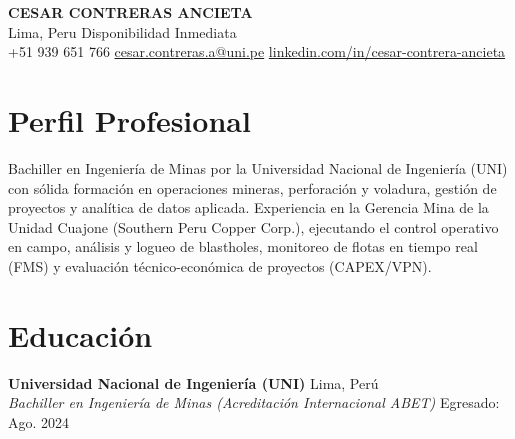 \documentclass[10pt, letterpaper]{article}
\begin{document}
\pagestyle{empty}

\begin{center}
    {\Huge \textbf{CESAR CONTRERAS ANCIETA}} \\
    \vspace{3pt}
    Lima, Peru \quad \textbar \quad Disponibilidad Inmediata \\
    +51 939 651 766 \quad \textbar \quad \href{mailto:cesar.contreras.a@uni.pe}{cesar.contreras.a@uni.pe} \quad \textbar \quad \href{https://linkedin.com/in/cesar-contrera-ancieta}{linkedin.com/in/cesar-contrera-ancieta}
\end{center}

\vspace{2pt}

\section{Perfil Profesional}
Bachiller en Ingeniería de Minas por la Universidad Nacional de Ingeniería (UNI) con sólida formación en operaciones mineras, perforación y voladura, gestión de proyectos y analítica de datos aplicada. Experiencia en la Gerencia Mina de la Unidad Cuajone (Southern Peru Copper Corp.), ejecutando el control operativo en campo, análisis y logueo de blastholes, monitoreo de flotas en tiempo real (FMS) y evaluación técnico-económica de proyectos (CAPEX/VPN).

\section{Educación}
\textbf{Universidad Nacional de Ingeniería (UNI)} \hfill Lima, Perú \\
\textit{Bachiller en Ingeniería de Minas (Acreditación Internacional ABET)} \hfill Egresado: Ago. 2024
\end{document}
